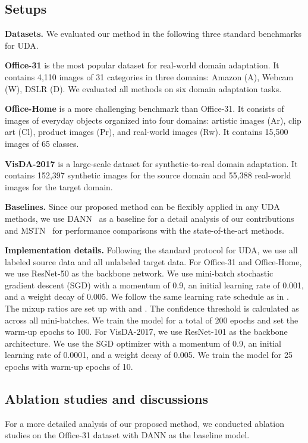 \documentclass[final]{cvpr}
\begin{document}
\subsection{Setups}
\textbf{Datasets.} We evaluated our method in the following three standard benchmarks for UDA.

\textbf{Office-31} \cite{Office-31} is the most popular dataset for real-world domain adaptation. It contains 4,110 images of 31 categories in three domains: Amazon (A), Webcam (W), DSLR (D). We evaluated all methods on six domain adaptation tasks. 

\textbf{Office-Home} \cite{Office-HOME} is a more challenging benchmark than Office-31. It consists of images of everyday objects organized into four domains: artistic images (Ar), clip art (Cl), product images (Pr), and real-world images (Rw). It contains 15,500 images of 65 classes. 

\textbf{VisDA-2017} \cite{VisDA2017} is a large-scale dataset for synthetic-to-real domain adaptation. It contains 152,397 synthetic images for the source domain and 55,388 real-world images for the target domain.

\textbf{Baselines.} Since our proposed method can be flexibly applied in any UDA methods, we use DANN~\cite{Ganin2015} as a baseline for a detail analysis of our contributions and MSTN~\cite{MSTN} for performance comparisons with the state-of-the-art methods.

\textbf{Implementation details.} Following the standard protocol for UDA, we use all labeled source data and all unlabeled target data. For Office-31 and Office-Home, we use ResNet-50 \cite{ResNet1, ResNet2} as the backbone network. We use mini-batch stochastic gradient descent (SGD) with a momentum of 0.9, an initial learning rate of 0.001, and a weight decay of 0.005. We follow the same learning rate schedule as in \cite{Ganin2015}. The mixup ratios are set up with  and . The confidence threshold  is calculated as  across all mini-batches. We train the model for a total of 200 epochs and set the warm-up epochs to 100. For VisDA-2017, we use ResNet-101 as the backbone architecture. We use the SGD optimizer with a momentum of 0.9, an initial learning rate of 0.0001, and a weight decay of 0.005. We train the model for 25 epochs with warm-up epochs of 10. 


\subsection{Ablation studies and discussions}
For a more detailed analysis of our proposed method, we conducted ablation studies on the Office-31 dataset with DANN \cite{Ganin2015} as the baseline model. 
\end{document}
